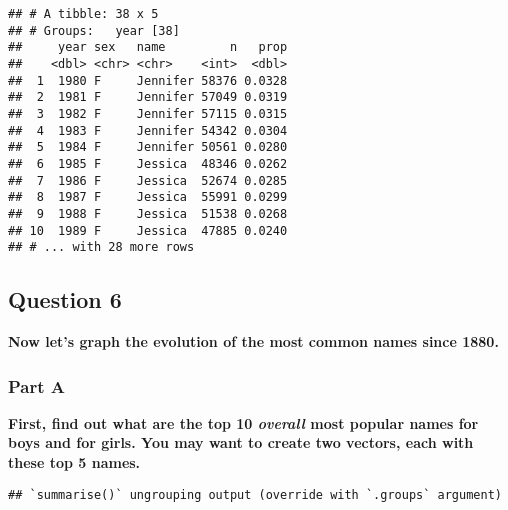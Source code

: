 \documentclass[
]{article}
\newenvironment{Shaded}{\begin{snugshade}}{\end{snugshade}}
\newcommand{\CommentTok}[1]{\textcolor[rgb]{0.56,0.35,0.01}{\textit{#1}}}
\newcommand{\DataTypeTok}[1]{\textcolor[rgb]{0.13,0.29,0.53}{#1}}
\newcommand{\DecValTok}[1]{\textcolor[rgb]{0.00,0.00,0.81}{#1}}
\newcommand{\KeywordTok}[1]{\textcolor[rgb]{0.13,0.29,0.53}{\textbf{#1}}}
\newcommand{\NormalTok}[1]{#1}
\newcommand{\OperatorTok}[1]{\textcolor[rgb]{0.81,0.36,0.00}{\textbf{#1}}}
\newcommand{\StringTok}[1]{\textcolor[rgb]{0.31,0.60,0.02}{#1}}
\begin{document}
\begin{verbatim}
## # A tibble: 38 x 5
## # Groups:   year [38]
##     year sex   name         n   prop
##    <dbl> <chr> <chr>    <int>  <dbl>
##  1  1980 F     Jennifer 58376 0.0328
##  2  1981 F     Jennifer 57049 0.0319
##  3  1982 F     Jennifer 57115 0.0315
##  4  1983 F     Jennifer 54342 0.0304
##  5  1984 F     Jennifer 50561 0.0280
##  6  1985 F     Jessica  48346 0.0262
##  7  1986 F     Jessica  52674 0.0285
##  8  1987 F     Jessica  55991 0.0299
##  9  1988 F     Jessica  51538 0.0268
## 10  1989 F     Jessica  47885 0.0240
## # ... with 28 more rows
\end{verbatim}

\hypertarget{question-6}{%
\subsection{Question 6}\label{question-6}}

\textbf{Now let's graph the evolution of the most common names since
1880.}

\hypertarget{part-a-2}{%
\subsubsection{Part A}\label{part-a-2}}

\textbf{First, find out what are the top 10 \emph{overall} most popular
names for boys and for girls. You may want to create two vectors, each
with these top 5 names.}

\begin{Shaded}
\end{Shaded}

\begin{verbatim}
## `summarise()` ungrouping output (override with `.groups` argument)
\end{verbatim}
\end{document}
